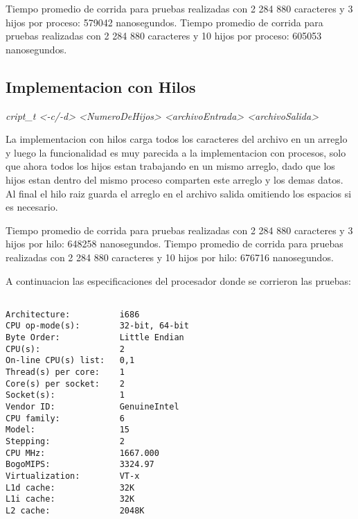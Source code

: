 \documentclass[paper=a4, fontsize=11pt]{scrartcl} %
\begin{document}
Tiempo promedio de corrida para pruebas realizadas con 2 284 880 caracteres y 3 hijos por proceso: 579042 nanosegundos.\newline
Tiempo promedio de corrida para pruebas realizadas con 2 284 880 caracteres y 10 hijos por proceso: 605053 nanosegundos.\newline


\subsection{Implementacion con Hilos}\newline

\emph{cript\_t <-c/-d> <NumeroDeHijos> <archivoEntrada> <archivoSalida>}\newline

La implementacion con hilos carga todos los caracteres del archivo en un arreglo y luego la funcionalidad es muy parecida a la implementacion con procesos, solo que ahora todos los hijos estan trabajando en un mismo arreglo, dado que los hijos estan dentro del mismo proceso comparten este arreglo y los demas datos. Al final el hilo raiz guarda el arreglo en el archivo salida omitiendo los espacios si es necesario.

Tiempo promedio de corrida para pruebas realizadas con 2 284 880 caracteres y 3 hijos por hilo: 648258 nanosegundos.\newline
Tiempo promedio de corrida para pruebas realizadas con 2 284 880 caracteres y 10 hijos por hilo: 676716 nanosegundos.\newline

\newpage

A continuacion las especificaciones del procesador donde se corrieron las pruebas:

\begin{verbatim}

Architecture:          i686
CPU op-mode(s):        32-bit, 64-bit
Byte Order:            Little Endian
CPU(s):                2
On-line CPU(s) list:   0,1
Thread(s) per core:    1
Core(s) per socket:    2
Socket(s):             1
Vendor ID:             GenuineIntel
CPU family:            6
Model:                 15
Stepping:              2
CPU MHz:               1667.000
BogoMIPS:              3324.97
Virtualization:        VT-x
L1d cache:             32K
L1i cache:             32K
L2 cache:              2048K

\end{verbatim}
\end{document}
